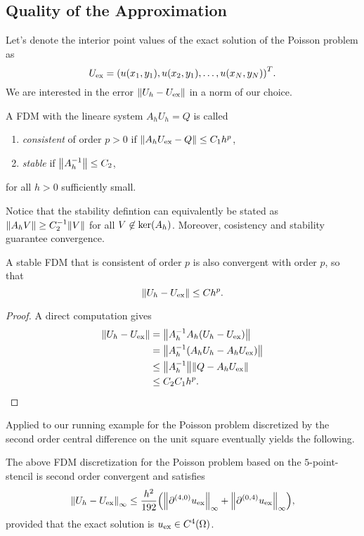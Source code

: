 \subsection{Quality of the Approximation}


Let's denote the interior point values of the exact solution of the Poisson problem as
\[
	U_{\text{ex}} = \parentheses*{u\parentheses*{x_1, y_1}, u\parentheses*{x_2, y_1}, \ldots, u\parentheses*{x_N, y_N}}^T.
\]
We are interested in the error \(\norm*{U_h - U_{\text{ex}}}\) in a norm of our choice.

\begin{definition}
	A FDM with the lineare system \(A_h U_h = Q\) is called
	\begin{enumerate}
		\item \emph{consistent} of order \(p > 0\) if \(\norm*{A_h U_{\text{ex}} - Q} \le C_1 h^p\),
		\item \emph{stable} if \(\norm*{A_h^{-1}} \le C_2\),
	\end{enumerate}
	for all \(h > 0\) sufficiently small.
\end{definition}

Notice that the stability defintion can equivalently be stated as \(\norm*{A_h V} \ge C_2^{-1}\norm*{V}\) for all \(V \not\in \ker\parentheses*{A_h}\).
Moreover, cosistency and stability guarantee convergence.

\begin{theorem}
	A stable FDM that is consistent of order \(p\) is also convergent with order \(p\), so that
	\[
		\norm*{U_h - U_{\text{ex}}} \le Ch^p.
	\]
\end{theorem}

\begin{proof}
	A direct computation gives
	\begin{align*}
		\norm*{U_h - U_{\text{ex}}} &= \norm*{A_h^{-1}A_h\parentheses*{U_h - U_{\text{ex}}}}\\
		&= \norm*{A_h^{-1}\parentheses*{A_h U_h - A_h U_{\text{ex}}}}\\
		&\le \norm*{A_h^{-1}}\norm*{Q - A_h U_{\text{ex}}}\\
		&\le C_2 C_1 h^p.
	\end{align*}
\end{proof}

Applied to our running example for the Poisson problem discretized by the second order central difference on the unit square eventually yields the following.

\begin{theorem}
	The above FDM discretization for the Poisson problem based on the \(5\)-point-stencil is second order convergent and satisfies
	\[
		\norm*{U_h - U_{\text{ex}}}_\infty \le \frac{h^2}{192}\parentheses*{\norm*{\partial^{\parentheses*{4, 0}}u_{\text{ex}}}_\infty + \norm*{\partial^{\parentheses*{0, 4}}u_{\text{ex}}}_\infty},
	\]
	provided that the exact solution is \(u_{\text{ex}} \in C^4\parentheses*{\Omega}\).
\end{theorem}

